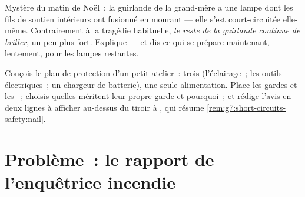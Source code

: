 \begin{exercise}[$\star\star$]\label{exo:g7:short-circuits-safety:11}
Mystère du matin de Noël~: la guirlande  de la grand-mère a
une lampe dont les fils de soutien intérieurs ont fusionné en
mourant --- elle s'est court-circuitée elle-même. Contrairement à la
tragédie habituelle, \emph{le reste de la guirlande continue de
briller}, un peu plus fort. Explique --- et dis ce qui se prépare
maintenant, lentement, pour les lampes restantes.
\end{exercise}

\begin{exercise}[$\star\star\star$]\label{exo:g7:short-circuits-safety:12}
Conçois le plan de protection d'un petit atelier~: trois   (l'éclairage~; les outils électriques~; un chargeur de
batterie), une seule alimentation. Place les gardes et les
~; choisis quelles  méritent leur propre garde
et pourquoi~; et rédige l'avis en deux lignes à afficher au-dessus du
tiroir à , qui résume
\cref{rem:g7:short-circuits-safety:nail}.
\end{exercise}

\section{Problème~: le rapport de l'enquêtrice incendie}

